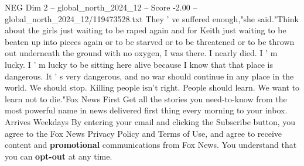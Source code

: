 \begin{textsample}{NEG Dim 2 – global\_north\_2024\_12 – Score -2.00 – global\_north\_2024\_12/119473528.txt}
They ' ve suffered enough,"she said."Think about the girls just waiting to be raped again and for Keith just waiting to be beaten up into pieces again or to be starved or to be threatened or to be thrown out underneath the ground with no oxygen, I was there.
I nearly died.
I ' m lucky.
I ' m lucky to be sitting here alive because I know that that place is dangerous.
It ' s very dangerous, and no war should continue in any place in the world.
We should stop.
Killing people isn't right.
People should learn.
We want to learn not to die."Fox News First Get all the stories you need-to-know from the most powerful name in news delivered first thing every morning to your inbox.
Arrives Weekdays By entering your email and clicking the Subscribe button, you agree to the Fox News Privacy Policy and Terms of Use, and agree to receive content and \textbf{promotional} communications from Fox News.
You understand that you can \textbf{opt-out} at any time.

\end{textsample}
